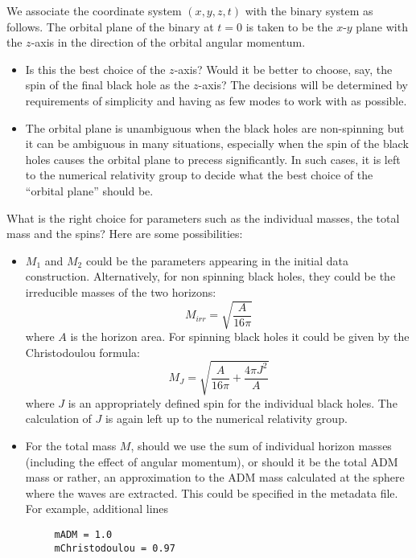 \documentclass[10pt]{ligodcc}
\begin{document}
We associate the coordinate system $(x,y,z,t)$ with the binary system
as follows.  The orbital plane of the binary at $t=0$ is taken to be
the $x$-$y$ plane with the $z$-axis in the direction of the orbital
angular momentum.
\begin{itemize}
\item Is this the best choice of the $z$-axis?  Would it be better to
  choose, say, the spin of the final black hole as the $z$-axis? The
  decisions will be determined by requirements of simplicity and
  having as few modes to work with as possible.
\item The orbital plane is unambiguous when the black holes are non-spinning
  but it can be ambiguous in many situations, especially when the spin
  of the black holes causes the orbital plane to precess significantly.
  In such cases, it is left to the numerical relativity group to decide
  what the best choice of the ``orbital plane'' should be. 
\end{itemize}
What is the right choice for parameters such as the individual masses,
the total mass and the spins?  Here are some possibilities:
\begin{itemize}
\item $M_1$ and $M_2$ could be the parameters appearing in the initial
  data construction.  Alternatively, for non spinning black holes,
  they could be the irreducible masses of the two horizons:
  \begin{equation}
    \label{eq:12}
    M_{irr} = \sqrt{\frac{A}{16\pi}}
  \end{equation}
  where $A$ is the horizon area.  For spinning black holes it could be
  given by the Christodoulou formula:
  \begin{equation}
    \label{eq:13}
    M_{J} = \sqrt{\frac{A}{16\pi} + \frac{4\pi J^2}{A}}
  \end{equation}
  where $J$ is an appropriately defined spin for the individual black
  holes.  The calculation of $J$ is again left up to the numerical
  relativity group.
\item For the total mass $M$, should we use the sum of individual
  horizon masses (including the effect of angular momentum), or should
  it be the total ADM mass or rather, an approximation to the ADM mass
  calculated at the sphere where the waves are extracted.  This could
  be specified in the metadata file.  For example, additional lines
  \begin{verbatim}
     mADM = 1.0
     mChristodoulou = 0.97
  \end{verbatim}
\end{itemize}
\end{document}
